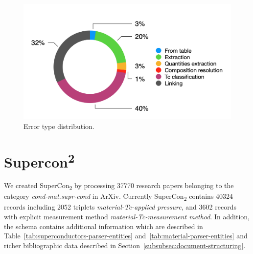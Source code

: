 \documentclass{article}
\begin{document}

\begin{figure}[ht]
\includegraphics[width=\textwidth]{error-type-distribution-image}
\caption{Error type distribution. }
\label{fig:error-types-distribution}
\end{figure}


\section{Supercon\textsuperscript{2}}

We created SuperCon\textsubscript{2} by processing 37770 research papers belonging to the category \textit{cond-mat.supr-cond} in ArXiv. Currently SuperCon\textsubscript{2} contains 40324 records including 2052 triplets \textit{material-Tc-applied pressure}, and 3602 records with explicit measurement method \textit{material-Tc-measurement method}.
In addition, the schema contains additional information which are described in Table~\ref{tab:superconductors-parser-entities} and~\ref{tab:material-parser-entities} and richer bibliographic data described in Section~\ref{subsubsec:document-structuring}. 
\end{document}
